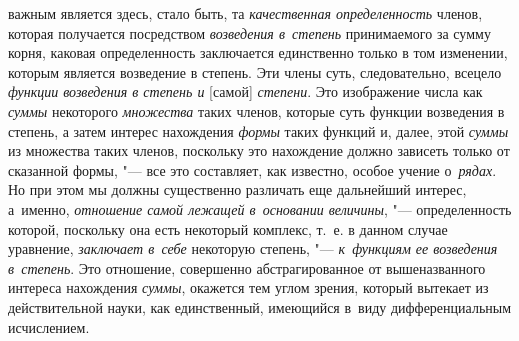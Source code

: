 важным является здесь, стало быть, та {\em качественная определенность} членов,
которая получается посредством {\em возведения в~степень} принимаемого за сумму
корня, каковая определенность заключается единственно только в том изменении,
которым является возведение в степень. Эти члены суть, следовательно, всецело
{\em функции возведения в степень и} [самой] {\em степени}. Это изображение
числа как {\em суммы} некоторого {\em множества} таких членов, которые суть
функции возведения в степень, а затем интерес нахождения {\em формы} таких
функций и, далее, этой {\em суммы} из множества таких членов, поскольку это
нахождение должно зависеть только от сказанной формы, "--- все это составляет,
как известно, особое учение о~{\em рядах}. Но при этом мы должны существенно
различать еще дальнейший интерес, а~именно, {\em отношение самой лежащей
в~основании величины}, "--- определенность которой, поскольку она есть
некоторый комплекс, т.~е. в данном случае уравнение, {\em заключает в~себе}
некоторую степень, "--- {\em к~функциям ее возведения в~степень}. Это
отношение, совершенно абстрагированное от вышеназванного интереса нахождения
{\em суммы}, окажется тем углом зрения, который вытекает из действительной
науки, как единственный, имеющийся в~виду дифференциальным исчислением.

